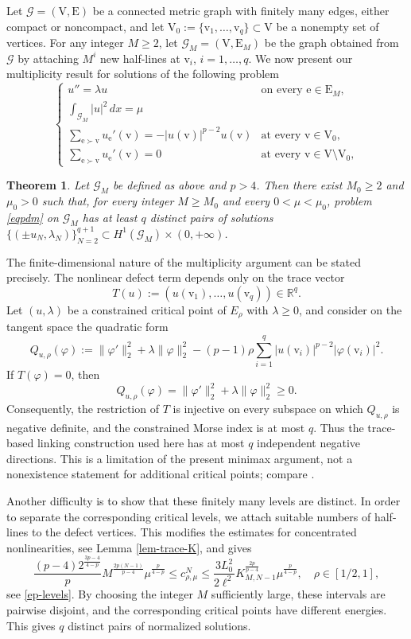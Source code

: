 \documentclass[11pt]{amsart}
\newtheorem{theorem}{Theorem}[section]
\newcommand{\abs}[1]{\lvert#1\rvert}
\newcommand{\G}{\mathcal{G}}
\newcommand{\E}{\mathrm{E}}
\newcommand{\V}{\mathrm{V}}
\newcommand{\e}{\mathrm{e}}
\newcommand{\vv}{\mathrm{v}}
\numberwithin{equation}{section}
\begin{document}
Let $\G=(\V,\E)$ be a connected metric graph with finitely many edges, either compact or noncompact, and let
$
\V_0:=\{\vv_1,\ldots,\vv_q\}\subset \V
$
be a nonempty set of vertices.
For any integer $M\geq 2$, let $\G_M=(\V,\E_M)$ be the graph obtained from $\G$ by attaching $M^{i}$ new half-lines at $\vv_i$, $i=1,\ldots,q$. We now present our multiplicity result for solutions of the following problem
\begin{equation}\label{eqpdm}
\begin{cases} 
u'' = \lambda u & \text{on every }\e \in \E_M, \\ 
\int_{\G_{M}}\abs{u }^2\, dx = \mu & \\
\displaystyle\sum_{\e \succ \vv} u_{\e}' (\vv)= -|u(\vv)|^{p-2}u(\vv)  & \text{at every } \vv \in \V_0,\\
\displaystyle\sum_{\e \succ \vv}u_{\e}' (\vv)=0  & \text{at every } \vv \in \V \setminus \V_0,
\end{cases}
\end{equation}
\begin{theorem}\label{th2}
Let $\G_M$ be defined as above and $p>4$. Then there exist $M_0\geq2$ and $\mu_0>0$ such that, for every integer $M\geq M_0$ and every $0<\mu<\mu_0$, problem \eqref{eqpdm} on $\G_M$ has at least $q$ distinct pairs of solutions $\{(\pm u_N,\lambda_N)\}_{N=2}^{q+1} \subset H^1(\G_{M}) \times (0,+\infty)$.
\end{theorem} 
The finite-dimensional nature of the multiplicity argument can be stated precisely. The nonlinear defect term depends only on the trace vector
\[
T(u):=(u(\vv_1),\ldots,u(\vv_q))\in\mathbb R^q.
\]
Let \((u,\lambda)\) be a constrained critical point of \(E_\rho\) with \(\lambda\geq0\), and consider on the tangent space the quadratic form
\[
Q_{u,\rho}(\varphi)
:=\|\varphi'\|_2^2+\lambda\|\varphi\|_2^2
-(p-1)\rho\sum_{i=1}^q|u(\vv_i)|^{p-2}|\varphi(\vv_i)|^2.
\]
If \(T(\varphi)=0\), then
\[
Q_{u,\rho}(\varphi)=\|\varphi'\|_2^2+\lambda\|\varphi\|_2^2\geq0.
\]
Consequently, the restriction of \(T\) is injective on every subspace on which \(Q_{u,\rho}\) is negative definite, and the constrained Morse index is at most \(q\). Thus the trace-based linking construction used here has at most \(q\) independent negative directions. This is a limitation of the present minimax argument, not a nonexistence statement for additional critical points; compare \cite{Ca}.

Another difficulty is to show that these finitely many levels are
distinct. In order to separate the corresponding critical levels, we attach suitable
numbers of half-lines to the defect vertices.  This modifies the estimates for concentrated nonlinearities, see Lemma \ref{lem-trace-K}, and gives
\begin{equation*}
 \frac{(p-4)2^{\frac{3p-4}{4-p}}}{p}M^{\frac{2p(N-1)}{p-4}}\mu^{\frac{p}{4-p}}\le c_{\rho,\mu}^N
\leq
\frac{3L_0^2}{2\ell^2}K^{\frac{2p}{p-4}}_{M,N-1}
\mu^\frac{p}{4-p}, \quad \rho\in [1/2,1],
\end{equation*} see \eqref{ep-levels}.
By choosing the integer \(M\) sufficiently large, these intervals are
pairwise disjoint, and the corresponding critical points have different energies. This
gives \(q\) distinct pairs of normalized solutions.
\end{document}
